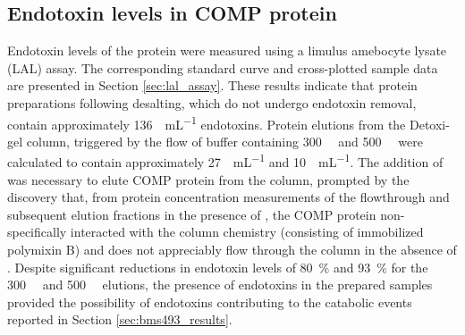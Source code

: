 \begin{refsection}
\subsection{Endotoxin levels in COMP protein}
\label{sec:endotoxins}

Endotoxin levels of the protein were measured using a limulus amebocyte lysate
(LAL) assay. The corresponding standard curve and cross-plotted sample data are
presented in Section \ref{sec:lal_assay}. These results indicate that protein
preparations following desalting, which do not undergo endotoxin removal,
contain approximately \SI{136}{\EU\per\mL} endotoxins.  Protein elutions from
the Detoxi-gel column, triggered by the flow of buffer containing
\SI{300}{\milli\moLar} and \SI{500}{\milli\moLar}  were calculated to
contain approximately \SI{27}{\EU\per\mL} and \SI{10}{\EU\per\mL}. The addition
of  was necessary to elute COMP protein from the column, prompted by
the discovery that, from protein concentration measurements of the flowthrough
and subsequent elution fractions in the presence of , the COMP protein
non-specifically interacted with the column chemistry (consisting of immobilized
polymixin B) and does not appreciably flow through the column in the absence of
. Despite significant reductions in endotoxin levels of
\SI{80}{\percent} and \SI{93}{\percent} for the \SI{300}{\milli\moLar} and
\SI{500}{\milli\moLar}  elutions, the presence of endotoxins in the
prepared samples provided the possibility of endotoxins contributing to the
catabolic events reported in Section \ref{sec:bms493_results}.


\end{refsection}
